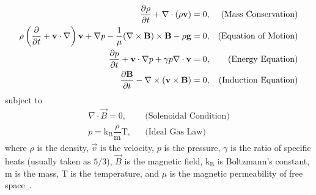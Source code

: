 \begin{align}                                                  
    \dfrac{\partial \rho }{\partial t} + \nabla \cdot (\rho \mathbf{v}) = 0,
    &&\text{(Mass Conservation)}\label{eq:imhd_mass}\\
    \rho  \left(\frac{\partial}{\partial t} + \mathbf{v}\cdot\nabla\right)\mathbf{v} + \nabla p - \dfrac{1}{\mu}(\nabla \times \mathbf{B}) \times \mathbf{B} - \rho \mathbf{g} = 0,
    &&\text{(Equation of Motion)}\label{eq:imhd_motion}\\
    \frac{\partial p}{\partial t} + \mathbf{v}\cdot\nabla p + \gamma p \nabla \cdot \mathbf{v}  = 0,
    &&\text{(Energy Equation)}\label{eq:imhd_equation}\\
    \dfrac{\partial \mathbf{B}}{\partial t} - \nabla \times (\mathbf{v} \times \mathbf{B}) = 0,
    &&\text{(Induction Equation)}\label{eq:imhd_induction}
\end{align}
subject to
\begin{align}
    \nabla \cdot \vec{B} = 0,
    &&\text{(Solenoidal Condition)}\\
    p = \mathrm{k_B} \dfrac{\rho}{\mathrm{m}} \mathrm{T},
    &&\text{(Ideal Gas Law)}                    
\end{align}
where $\rho$ is the density, $\vec{v}$ is the velocity, $p$ is the pressure, $\gamma$ is the ratio of specific heats (usually taken as $5/3$), $\vec{B}$ is the magnetic field, $\mathrm{k_B}$ is Boltzmann's constant, $\mathrm{m}$ is the mass, $\mathrm{T}$ is the temperature, and $\mu$ is the magnetic permeability of free space~\citep{goedbloed2004}.


